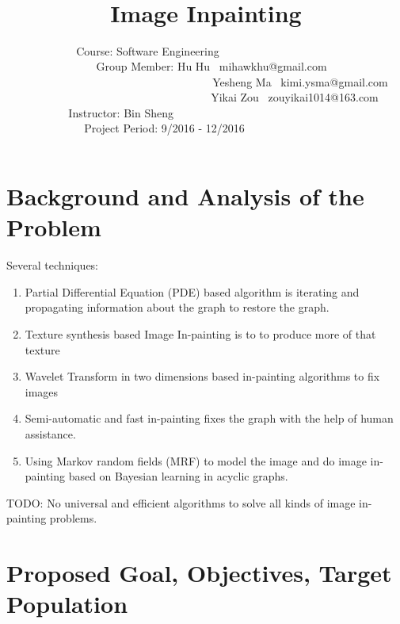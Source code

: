 \documentclass[12pt]{article}
\begin{document}
\title{\huge\textbf{\ \\ \ \\Image Inpainting}\vspace{11cm}}
\author{	
	\large
	Course: Software Engineering\ \ \ \ \ \ \  \ \  \  \  \ \ \ \ \ \  \ \ \ \ \\
	\ \ \ \ \ \ \ \ \ \ \ Group Member: Hu Hu \ mihawkhu@gmail.com\ \ \ \ \ \ \ \ \ \\
	\ \ \ \ \ \ \ \ \  \ \ \ \ \ \ \ \ \ \ \ \ \ \ \ \ \ \ \ \ \ \ \ \ \ Yesheng Ma \ kimi.ysma@gmail.com \\
	\ \ \ \ \ \ \ \ \  \ \ \ \ \ \ \ \ \ \ \ \ \ \ \ \ \ \ \ \ \ \   \ Yikai Zou \ zouyikai1014@163.com\\
	Instructor: Bin Sheng \ \ \ \ \ \ \ \  \ \ \ \ \ \ \ \ \ \ \ \ \ \ \  \ \ \ \ \ \ \ \\
	Project Period: 9/2016 - 12/2016\ \ \ \ \  \ \ \ \ \ \ \ \ \ \ 	
	} \date{ }

\maketitle\thispagestyle{empty}
\newpage
\tableofcontents\thispagestyle{empty}
\newpage
\section{Background and Analysis of the Problem}
Several techniques:
\begin{enumerate}[1.]
	\item Partial Differential Equation (PDE) based algorithm is iterating and propagating information about the graph to restore the graph.
	\item Texture synthesis based Image In-painting is to to produce more of that texture
	\item Wavelet Transform in two dimensions based in-painting algorithms to fix images
	\item Semi-automatic and fast in-painting fixes the graph with the help of human assistance.
	\item Using Markov random fields (MRF) to model the image and do image in-painting based on Bayesian learning in acyclic graphs.
\end{enumerate}
TODO:
No universal and efficient algorithms to solve all kinds of image in-painting problems.


\section{Proposed Goal, Objectives, Target Population}
\end{document}

